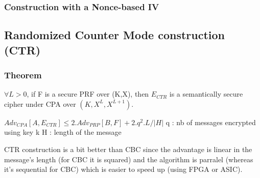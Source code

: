 \subsubsection{Construction with a Nonce-based IV}

\subsection{Randomized Counter Mode construction (CTR)}


\subsubsection{Theorem}

$\forall L>0$, if F is a secure PRF over (K,X), then $E_{CTR}$ is a semantically secure cipher under CPA over $(K,X^L,X^{L+1})$.

$Adv_{CPA}[A,E_{CTR}] \leq 2.Adv_{PRP}[B,F] + 2.q^2.L/|H| $
q : nb of messages encrypted using key k
H : length of the message

CTR construction is a bit better than CBC since the advantage is linear in the message's length (for CBC it is squared) and the algorithm is parralel (whereas it's sequential for CBC) which is easier to speed up (using FPGA or ASIC).






